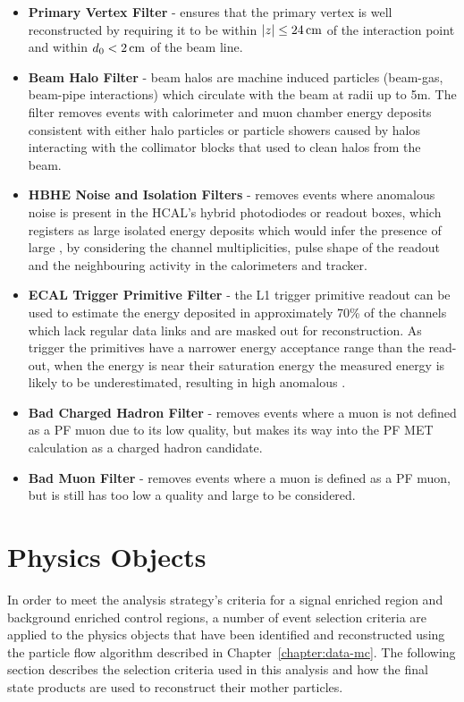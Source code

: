 \begin{itemize}
\item \textbf{Primary Vertex Filter} - ensures that the primary vertex is well reconstructed by requiring it to be within $|z| \leq 24\,\text{cm}$ of the interaction point and within $d_{0} < 2\,\text{cm}$ of the beam line.
\item \textbf{Beam Halo Filter} - beam halos are machine induced particles (\eg beam-gas, beam-pipe interactions) which circulate with the beam at radii up to 5m. The filter removes events with calorimeter and muon chamber energy deposits consistent with either halo particles or particle showers caused by halos interacting with the collimator blocks that used to clean halos from the beam.
\item \textbf{HBHE Noise and Isolation Filters} - removes events where anomalous noise is present in the HCAL's hybrid photodiodes or readout boxes, which registers as large isolated energy deposits which would infer the presence of large \MET, by considering the channel multiplicities, pulse shape of the readout and the neighbouring activity in the calorimeters and tracker.
\item \textbf{ECAL Trigger Primitive Filter} - the L1 trigger primitive readout can be used to estimate the energy deposited in approximately 70\% of the channels which lack regular data links and are masked out for reconstruction. As trigger the primitives have a narrower energy acceptance range than the read-out, when the energy is near their saturation energy the measured energy is likely to be underestimated, resulting in high anomalous \MET. 
\item \textbf{Bad Charged Hadron Filter} - removes events where a muon is not defined as a PF muon due to its low quality, but makes its way into the PF MET calculation as a charged hadron candidate.
\item \textbf{Bad Muon Filter} - removes events where a muon is defined as a PF muon, but is still has too low a quality and large \pT to be considered.
\end{itemize}

\section{Physics Objects}\label{sec:physicsObjects}
In order to meet the analysis strategy's criteria for a signal enriched region and background enriched control regions, a number of event selection criteria are applied to the physics objects that have been identified and reconstructed using the particle flow algorithm described in Chapter~\ref{chapter:data-mc}.
The following section describes the selection criteria used in this analysis and how the final state products are used to reconstruct their mother particles.

